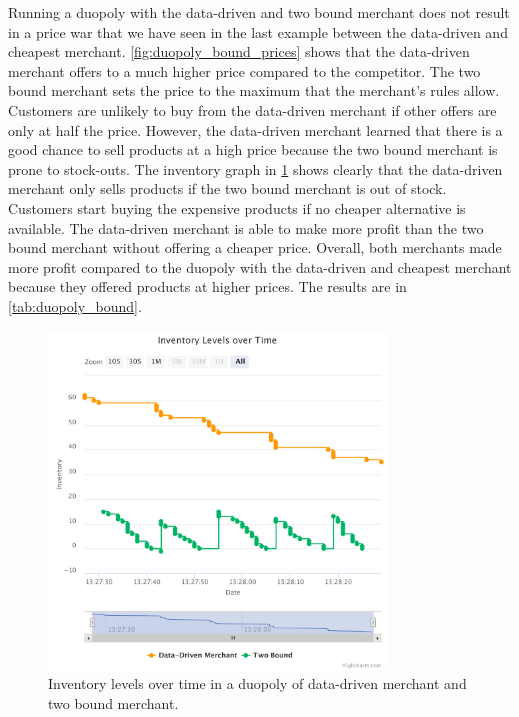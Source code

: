 Running a duopoly with the data-driven and two bound merchant does not result in a price war that we have seen in the last example between the data-driven and cheapest merchant.
\cref{fig:duopoly_bound_prices} shows that the data-driven merchant offers to a much higher price compared to the competitor.
The two bound merchant sets the price to the maximum that the merchant's rules allow.
Customers are unlikely to buy from the data-driven merchant if other offers are only at half the price.
However, the data-driven merchant learned that there is a good chance to sell products at a high price because the two bound merchant is prone to stock-outs.
The inventory graph in \cref{fig:duopoly_bound_inventory} shows clearly that the data-driven merchant only sells products if the two bound merchant is out of stock.
Customers start buying the expensive products if no cheaper alternative is available.
The data-driven merchant is able to make more profit than the two bound merchant without offering a cheaper price.
Overall, both merchants made more profit compared to the duopoly with the data-driven and cheapest merchant because they offered products at higher prices.
The results are in \cref{tab:duopoly_bound}.

\begin{figure}[t]
	\centering
	\includegraphics[width=0.8\textwidth]{figures/duopoly_bound_inventory}
	\caption{Inventory levels over time in a duopoly of data-driven merchant and two bound merchant.}
	\label{fig:duopoly_bound_inventory}
\end{figure}

